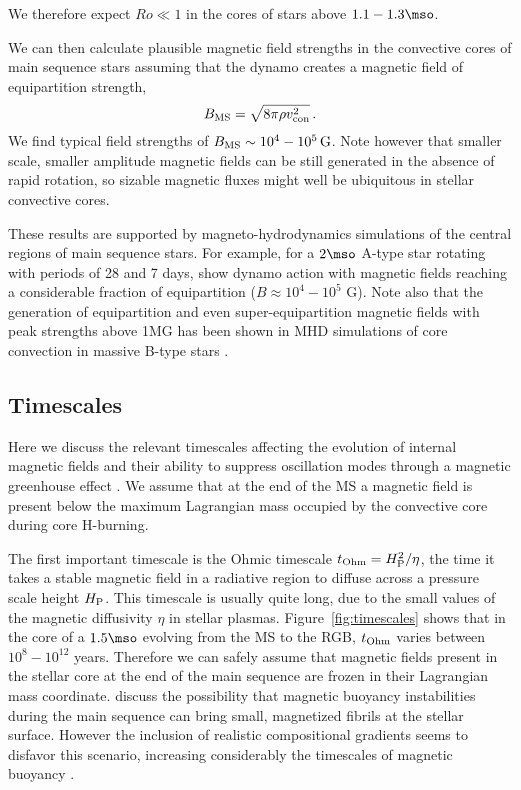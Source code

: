 We therefore expect $Ro \ll 1$ in the cores of stars above $1.1-1.3\mso$. 

We can then calculate plausible magnetic field strengths in the convective cores of main sequence stars assuming that the dynamo creates a magnetic field of equipartition strength,
\begin{equation}
\label{eqn:Beq}
B_{\rm MS} = \sqrt{ 8 \pi \rho v_{\rm con}^2} \, .
\end{equation}
We find typical field strengths of $B_{\rm MS} \sim 10^4 - 10^5 \, {\rm G}$. Note however that smaller scale, smaller amplitude magnetic fields can be still generated in the absence of rapid rotation, so sizable magnetic fluxes might well be ubiquitous in stellar convective cores. 

These results are supported by magneto-hydrodynamics simulations of the central regions of main sequence stars. For example, for a $2\mso$ A-type star rotating with periods of 28 and 7 days, \citet{Brun_2005}
show dynamo action with magnetic fields reaching a considerable fraction of equipartition ($B \approx 10^4-10^5$ G). 
Note also that the generation of equipartition and even super-equipartition magnetic fields with peak strengths above 1MG has been shown in MHD simulations of core convection in massive B-type stars \cite{2013PhDT.......388A}.




\subsection{Timescales}
\label{time}

Here we discuss the relevant timescales affecting the evolution of internal magnetic fields and their ability to 
suppress oscillation modes through a magnetic greenhouse effect \citep{Fuller_2015}.
We assume that at the end of the MS a magnetic field is present below the maximum Lagrangian mass occupied by the convective core during core H-burning.

The first important timescale is the Ohmic timescale $t_{\rm Ohm}= H_{\rm P}^2/\eta$, the time it takes a stable magnetic field in a radiative region to diffuse across a pressure scale height $H_{\rm P}$. This timescale is usually quite long, due to the small values of the magnetic diffusivity $\eta$ in stellar plasmas. Figure~\ref{fig:timescales} shows that in the core of a $1.5\mso$ evolving from the MS to the RGB, $t_{\rm Ohm}$ varies between $10^8-10^{12}$ years. Therefore we can safely assume that magnetic fields present in the stellar core at the end of the main sequence are frozen in their Lagrangian mass coordinate.
\citet{MacGregor_2003} discuss the possibility that magnetic buoyancy instabilities during the main sequence can bring small, magnetized fibrils at the stellar surface. However the inclusion of realistic compositional gradients seems to disfavor this scenario, increasing considerably the timescales of magnetic buoyancy \citep{MacDonald_2004}.

